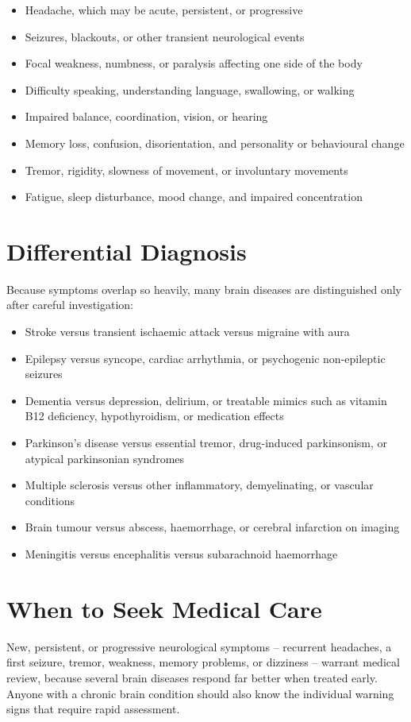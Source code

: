 \begin{itemize}
    \item Headache, which may be acute, persistent, or progressive
    \item Seizures, blackouts, or other transient neurological events
    \item Focal weakness, numbness, or paralysis affecting one side of the body
    \item Difficulty speaking, understanding language, swallowing, or walking
    \item Impaired balance, coordination, vision, or hearing
    \item Memory loss, confusion, disorientation, and personality or behavioural change
    \item Tremor, rigidity, slowness of movement, or involuntary movements
    \item Fatigue, sleep disturbance, mood change, and impaired concentration
\end{itemize}

\section*{Differential Diagnosis}
Because symptoms overlap so heavily, many brain diseases are distinguished only after careful investigation:

\begin{itemize}
    \item Stroke versus transient ischaemic attack versus migraine with aura
    \item Epilepsy versus syncope, cardiac arrhythmia, or psychogenic non-epileptic seizures
    \item Dementia versus depression, delirium, or treatable mimics such as vitamin B12 deficiency, hypothyroidism, or medication effects
    \item Parkinson's disease versus essential tremor, drug-induced parkinsonism, or atypical parkinsonian syndromes
    \item Multiple sclerosis versus other inflammatory, demyelinating, or vascular conditions
    \item Brain tumour versus abscess, haemorrhage, or cerebral infarction on imaging
    \item Meningitis versus encephalitis versus subarachnoid haemorrhage
\end{itemize}

\section*{When to Seek Medical Care}
New, persistent, or progressive neurological symptoms -- recurrent headaches, a first seizure, tremor, weakness, memory problems, or dizziness -- warrant medical review, because several brain diseases respond far better when treated early. Anyone with a chronic brain condition should also know the individual warning signs that require rapid assessment.

